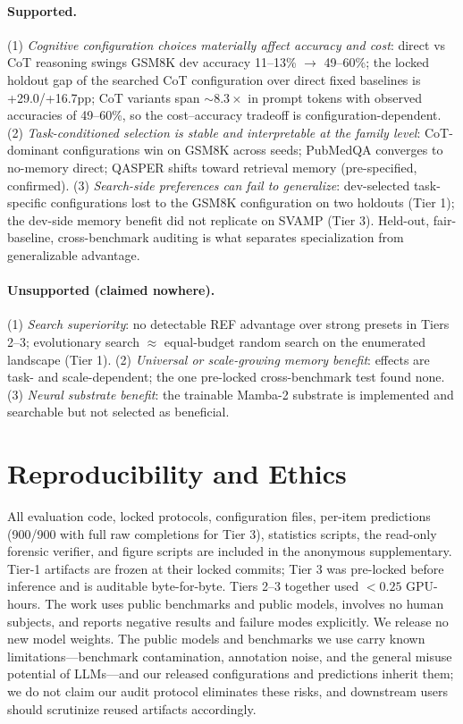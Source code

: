 \documentclass[11pt]{article}
\begin{document}
\paragraph{Supported.}
(1) \emph{Cognitive configuration choices materially affect accuracy and
cost}: direct vs CoT reasoning swings GSM8K dev accuracy 11--13\%
$\rightarrow$ 49--60\%; the locked holdout gap of the searched CoT
configuration over direct fixed baselines is +29.0/+16.7pp; CoT variants
span ${\sim}8.3\times$ in prompt tokens with observed accuracies of
49--60\%, so the cost--accuracy tradeoff is configuration-dependent.
(2) \emph{Task-conditioned selection is stable and interpretable at the
family level}: CoT-dominant configurations win on GSM8K across seeds;
PubMedQA converges to no-memory direct; QASPER shifts toward retrieval
memory (pre-specified, confirmed).
(3) \emph{Search-side preferences can fail to generalize}: dev-selected
task-specific configurations lost to the GSM8K configuration on two
holdouts (Tier 1); the dev-side memory benefit did not replicate on SVAMP
(Tier 3). Held-out, fair-baseline, cross-benchmark auditing is what
separates specialization from generalizable advantage.

\paragraph{Unsupported (claimed nowhere).}
(1) \emph{Search superiority}: no detectable REF advantage over strong
presets in Tiers 2--3; evolutionary search $\approx$ equal-budget random
search on the enumerated landscape (Tier 1).
(2) \emph{Universal or scale-growing memory benefit}: effects are task-
and scale-dependent; the one pre-locked cross-benchmark test found none.
(3) \emph{Neural substrate benefit}: the trainable Mamba-2 substrate is
implemented and searchable but not selected as beneficial.

\section{Reproducibility and Ethics}

All evaluation code, locked protocols, configuration files, per-item
predictions (900/900 with full raw completions for Tier 3), statistics
scripts, the read-only forensic verifier, and figure scripts are included
in the anonymous supplementary. Tier-1 artifacts are frozen at their locked
commits; Tier 3 was pre-locked before inference and is auditable
byte-for-byte. Tiers 2--3 together used $<0.25$ GPU-hours. The work uses
public benchmarks and public models, involves no human subjects, and
reports negative results and failure modes explicitly. We release no new
model weights. The public models and benchmarks we use carry known
limitations---benchmark contamination, annotation noise, and the general
misuse potential of LLMs---and our released configurations and predictions
inherit them; we do not claim our audit protocol eliminates these risks,
and downstream users should scrutinize reused artifacts accordingly.
\end{document}
